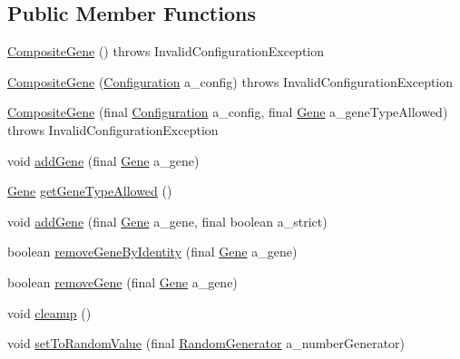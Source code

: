 \subsection*{Public Member Functions}
\begin{DoxyCompactItemize}
\item 
\hyperlink{classorg_1_1jgap_1_1impl_1_1_composite_gene_a564e6b2959bb4b0203cbcbda2fa0e75f}{Composite\-Gene} ()  throws Invalid\-Configuration\-Exception 
\item 
\hyperlink{classorg_1_1jgap_1_1impl_1_1_composite_gene_af834b058b7ad9e396c761ca47eaa5192}{Composite\-Gene} (\hyperlink{classorg_1_1jgap_1_1_configuration}{Configuration} a\-\_\-config)  throws Invalid\-Configuration\-Exception 
\item 
\hyperlink{classorg_1_1jgap_1_1impl_1_1_composite_gene_a905c8f416472c504d93ba6a97fb17be6}{Composite\-Gene} (final \hyperlink{classorg_1_1jgap_1_1_configuration}{Configuration} a\-\_\-config, final \hyperlink{interfaceorg_1_1jgap_1_1_gene}{Gene} a\-\_\-gene\-Type\-Allowed)  throws Invalid\-Configuration\-Exception 
\item 
void \hyperlink{classorg_1_1jgap_1_1impl_1_1_composite_gene_ab452b46689654525e3df79bf1ca242f3}{add\-Gene} (final \hyperlink{interfaceorg_1_1jgap_1_1_gene}{Gene} a\-\_\-gene)
\item 
\hyperlink{interfaceorg_1_1jgap_1_1_gene}{Gene} \hyperlink{classorg_1_1jgap_1_1impl_1_1_composite_gene_aabb760c92e6d5ae8c866c0bd41c6b6a3}{get\-Gene\-Type\-Allowed} ()
\item 
void \hyperlink{classorg_1_1jgap_1_1impl_1_1_composite_gene_ac8b7dd5b3d2fb4ade4e9d5c95ad4e719}{add\-Gene} (final \hyperlink{interfaceorg_1_1jgap_1_1_gene}{Gene} a\-\_\-gene, final boolean a\-\_\-strict)
\item 
boolean \hyperlink{classorg_1_1jgap_1_1impl_1_1_composite_gene_a770487c7ce405ffc76c0c5ead65342ce}{remove\-Gene\-By\-Identity} (final \hyperlink{interfaceorg_1_1jgap_1_1_gene}{Gene} a\-\_\-gene)
\item 
boolean \hyperlink{classorg_1_1jgap_1_1impl_1_1_composite_gene_a9d45afd175bbbe529fdb5a51c5ac0945}{remove\-Gene} (final \hyperlink{interfaceorg_1_1jgap_1_1_gene}{Gene} a\-\_\-gene)
\item 
void \hyperlink{classorg_1_1jgap_1_1impl_1_1_composite_gene_a69244d0036ad5f7f05766a3341f21841}{cleanup} ()
\item 
void \hyperlink{classorg_1_1jgap_1_1impl_1_1_composite_gene_a41d0187fbd5adbcb7c3bfff7d76f1180}{set\-To\-Random\-Value} (final \hyperlink{interfaceorg_1_1jgap_1_1_random_generator}{Random\-Generator} a\-\_\-number\-Generator)

\end{DoxyCompactItemize}
